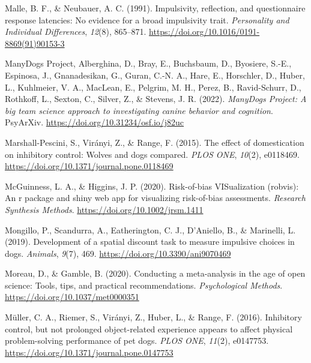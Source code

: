 \documentclass[
  ,pub,floatsintext]{apa6}
\newlength{\cslhangindent}
\newlength{\cslentryspacingunit} %
\newenvironment{CSLReferences}[2] %
 {%
  \setlength{\parindent}{0pt}
  \ifodd #1
  \let\oldpar\par
  \def\par{\hangindent=\cslhangindent\oldpar}
  \fi
  \setlength{\parskip}{#2\cslentryspacingunit}
 }%
 {}
\begin{document}
\begin{CSLReferences}{1}{0}
\leavevmode{}%
Malle, B. F., \& Neubauer, A. C. (1991). Impulsivity, reflection, and questionnaire response latencies: {No} evidence for a broad impulsivity trait. \emph{Personality and Individual Differences}, \emph{12}(8), 865--871. \url{https://doi.org/10.1016/0191-8869(91)90153-3}

\leavevmode{}%
ManyDogs Project, Alberghina, D., Bray, E., Buchsbaum, D., Byosiere, S.-E., Espinosa, J., Gnanadesikan, G., Guran, C.-N. A., Hare, E., Horschler, D., Huber, L., Kuhlmeier, V. A., MacLean, E., Pelgrim, M. H., Perez, B., Ravid-Schurr, D., Rothkoff, L., Sexton, C., Silver, Z., \& Stevens, J. R. (2022). \emph{{ManyDogs Project}: {A} big team science approach to investigating canine behavior and cognition}. {PsyArXiv}. \url{https://doi.org/10.31234/osf.io/j82uc}

\leavevmode{}%
Marshall-Pescini, S., Virányi, Z., \& Range, F. (2015). The effect of domestication on inhibitory control: Wolves and dogs compared. \emph{PLOS ONE}, \emph{10}(2), e0118469. \url{https://doi.org/10.1371/journal.pone.0118469}

\leavevmode{}%
McGuinness, L. A., \& Higgins, J. P. (2020). Risk-of-bias VISualization (robvis): An r package and shiny web app for visualizing risk-of-bias assessments. \emph{Research Synthesis Methods}. \url{https://doi.org/10.1002/jrsm.1411}

\leavevmode{}%
Mongillo, P., Scandurra, A., Eatherington, C. J., D'Aniello, B., \& Marinelli, L. (2019). Development of a spatial discount task to measure impulsive choices in dogs. \emph{Animals}, \emph{9}(7), 469. \url{https://doi.org/10.3390/ani9070469}

\leavevmode{}%
Moreau, D., \& Gamble, B. (2020). Conducting a meta-analysis in the age of open science: {Tools}, tips, and practical recommendations. \emph{Psychological Methods}. \url{https://doi.org/10.1037/met0000351}

\leavevmode{}%
Müller, C. A., Riemer, S., Virányi, Z., Huber, L., \& Range, F. (2016). Inhibitory control, but not prolonged object-related experience appears to affect physical problem-solving performance of pet dogs. \emph{PLOS ONE}, \emph{11}(2), e0147753. \url{https://doi.org/10.1371/journal.pone.0147753}


\end{CSLReferences}
\end{document}
